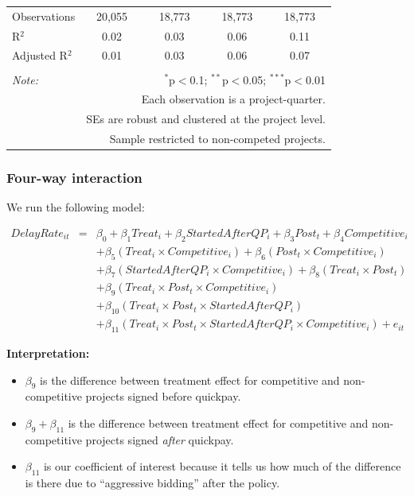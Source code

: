 \documentclass[]{article}
\providecommand{\tightlist}{%
  \setlength{\itemsep}{0pt}\setlength{\parskip}{0pt}}
\begin{document}
\begin{table}[H]
\begin{tabular}{@{\extracolsep{-2pt}}lcccc}
Observations & 20,055 & 18,773 & 18,773 & 18,773 \\ 
R$^{2}$ & 0.02 & 0.03 & 0.06 & 0.11 \\ 
Adjusted R$^{2}$ & 0.01 & 0.03 & 0.06 & 0.07 \\ 
\hline 
\hline \\[-1.8ex] 
\textit{Note:}  & \multicolumn{4}{r}{$^{*}$p$<$0.1; $^{**}$p$<$0.05; $^{***}$p$<$0.01} \\ 
 & \multicolumn{4}{r}{Each observation is a project-quarter.} \\ 
 & \multicolumn{4}{r}{SEs are robust and clustered at the project level.} \\ 
 & \multicolumn{4}{r}{Sample restricted to non-competed projects.} \\ 
\end{tabular} 
\end{table}

\hypertarget{four-way-interaction}{%
\subsubsection{Four-way interaction}\label{four-way-interaction}}

We run the following model:

\[\begin{aligned} DelayRate_{it} &=& \beta_0 +\beta_1 Treat_i+ \beta_2 StartedAfterQP_i+ \beta_3 Post_t+ \beta_4 Competitive_i\\ && +  \beta_5 (Treat_i \times Competitive_i) + \beta_6 (Post_t \times Competitive_i)\\ && +  \beta_7 (StartedAfterQP_i \times Competitive_i) +\beta_8 (Treat_i \times Post_t)\\ && + \beta_9 (Treat_i \times Post_t \times Competitive_i) \\ && + \beta_{10} (Treat_i \times Post_t \times StartedAfterQP_i )\\ && + \beta_{11} (Treat_i \times Post_t \times StartedAfterQP_i \times Competitive_i) + e_{it} \end{aligned}\]

\textbf{Interpretation:}

\begin{itemize}
\tightlist
\item
  \(\beta_9\) is the difference between treatment effect for competitive
  and non-competitive projects signed before quickpay.
\item
  \(\beta_9 + \beta_{11}\) is the difference between treatment effect
  for competitive and non-competitive projects signed \emph{after}
  quickpay.
\item
  \(\beta_{11}\) is our coefficient of interest because it tells us how
  much of the difference is there due to ``aggressive bidding'' after
  the policy.
\end{itemize}
\end{document}
